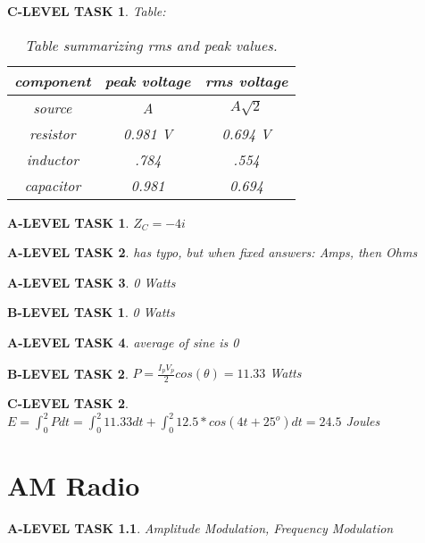 \documentclass{book}
\numberwithin{equation}{section}
\newtheorem{alevel}{A-LEVEL TASK}
\newtheorem{blevel}{B-LEVEL TASK}
\newtheorem{clevel}{C-LEVEL TASK}
\theoremstyle{definition}
\begin{document}
\begin{clevel} Table:\par
\begin{table}[H]
\begin{center}
\begin{tabular}{|c|c|c|}\hline
component&peak voltage&rms voltage\\ \hline
source&A&$A\sqrt{2}$\\ \hline
resistor&0.981 V&0.694 V\\ \hline
inductor&.784&.554\\ \hline
capacitor&0.981&0.694\\ \hline
\end{tabular}
\caption{Table summarizing rms and peak values.}
\label{T:8R}
\end{center}
\end{table}
\end{clevel}
\begin{alevel} $Z_C=-4i$ \end{alevel}
\begin{alevel} has typo, but when fixed answers: Amps, then Ohms  \end{alevel}
\begin{alevel} 0 Watts \end{alevel}
\begin{blevel} 0 Watts \end{blevel}
\begin{alevel} average of sine is 0 \end{alevel}
\begin{blevel} $P=\frac{I_pV_p}{2}cos(\theta)=11.33$ Watts \end{blevel}
\begin{clevel} $E=\int_0^2{Pdt}=\int_0^2{11.33dt}+\int_0^2{12.5*cos(4t+25^o)dt}=24.5$ Joules\end{clevel}

\setcounter{alevel}{0} \setcounter{blevel}{0} \setcounter{clevel}{0} \setcounter{dlevel}{0}
\chapter{AM Radio}
\begin{alevel} Amplitude Modulation, Frequency Modulation \end{alevel}
\end{document}
